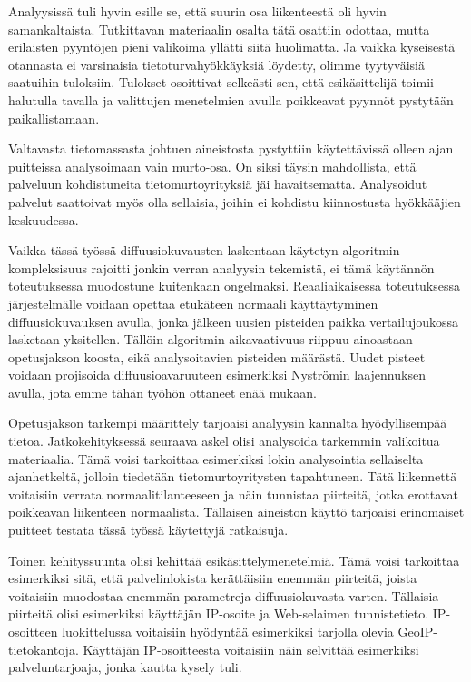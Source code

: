 Analyysissä tuli hyvin esille se, että suurin osa liikenteestä oli
hyvin samankaltaista. Tutkittavan materiaalin osalta tätä osattiin
odottaa, mutta erilaisten pyyntöjen pieni valikoima yllätti siitä
huolimatta. Ja vaikka kyseisestä otannasta ei varsinaisia
tietoturvahyökkäyksiä löydetty, olimme tyytyväisiä saatuihin
tuloksiin. Tulokset osoittivat selkeästi sen, että esikäsittelijä
toimii halutulla tavalla ja valittujen menetelmien avulla poikkeavat
pyynnöt pystytään paikallistamaan.

Valtavasta tietomassasta johtuen aineistosta pystyttiin käytettävissä
olleen ajan puitteissa analysoimaan vain murto-osa. On siksi täysin
mahdollista, että palveluun kohdistuneita tietomurtoyrityksiä jäi
havaitsematta. Analysoidut palvelut saattoivat myös olla sellaisia,
joihin ei kohdistu kiinnostusta hyökkääjien keskuudessa.

Vaikka tässä työssä diffuusiokuvausten laskentaan käytetyn algoritmin
kompleksisuus rajoitti jonkin verran analyysin tekemistä, ei tämä
käytännön toteutuksessa muodostune kuitenkaan
ongelmaksi. Reaaliaikaisessa toteutuksessa järjestelmälle voidaan
opettaa etukäteen normaali käyttäytyminen diffuusiokuvauksen avulla,
jonka jälkeen uusien pisteiden paikka vertailujoukossa lasketaan
yksitellen. Tällöin algoritmin aikavaativuus riippuu ainoastaan
opetusjakson koosta, eikä analysoitavien pisteiden määrästä. Uudet
pisteet voidaan projisoida diffuusioavaruuteen esimerkiksi Nyströmin
laajennuksen avulla, jota emme tähän työhön ottaneet enää
mukaan.

Opetusjakson tarkempi määrittely tarjoaisi analyysin kannalta
hyödyllisempää tietoa. Jatkokehityksessä seuraava askel olisi
analysoida tarkemmin valikoitua materiaalia. Tämä voisi tarkoittaa
esimerkiksi lokin analysointia sellaiselta ajanhetkeltä, jolloin tiedetään
tietomurtoyritysten tapahtuneen. Tätä liikennettä voitaisiin verrata
normaalitilanteeseen ja näin tunnistaa piirteitä, jotka erottavat
poikkeavan liikenteen normaalista.  Tällaisen aineiston käyttö
tarjoaisi erinomaiset puitteet testata tässä työssä käytettyjä
ratkaisuja.

Toinen kehityssuunta olisi kehittää esikäsittelymenetelmiä. Tämä voisi
tarkoittaa esimerkiksi sitä, että palvelinlokista kerättäisiin enemmän
piirteitä, joista voitaisiin muodostaa enemmän parametreja
diffuusiokuvasta varten. Tällaisia piirteitä olisi esimerkiksi
käyttäjän IP-osoite ja Web-selaimen tunnistetieto. IP-osoitteen
luokittelussa voitaisiin hyödyntää esimerkiksi tarjolla olevia
GeoIP-\-tietokantoja. Käyttäjän IP-osoitteesta voitaisiin näin
selvittää esimerkiksi palveluntarjoaja, jonka kautta kysely
tuli.


